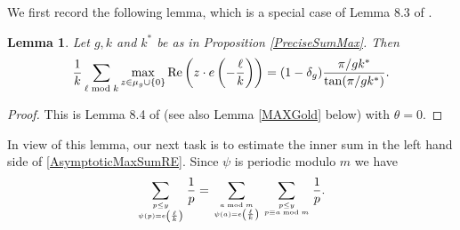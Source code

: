 \documentclass[12pt]{amsart}
\newtheorem{lem}[thm]{Lemma}
\theoremstyle{definition}
\numberwithin{equation}{section}
\newcommand{\mbf}{\mathbf}
\begin{document}
We first record the following lemma, which is a special case of Lemma 8.3 of \cite{GOLD}. 
\begin{lem} \label{MAX}
Let $g,k$ and $k^{\ast}$ be as in Proposition \ref{PreciseSumMax}. Then
\begin{equation*}
\frac{1}{k}\sum_{\ell\bmod k}\max_{z \in \mu_g \cup \{0\}} \textup{Re}\left(z \cdot e\left(-\frac{\ell}{k}\right)\right) = (1-\delta_g)\frac{\pi/gk^{\ast}}{\tan(\pi/gk^{\ast})}. 
\end{equation*}
\end{lem}
\begin{proof}
This is Lemma 8.4 of \cite{GOLD} (see also Lemma \ref{MAXGold} below) with $\theta=0$.
\end{proof}

In view of this lemma, our next task is to estimate the inner sum in the left hand side of \eqref{AsymptoticMaxSumRE}. Since $\psi$ is periodic modulo $m$ we have
\begin{equation} \label{ALLAS}
\sum_{p \leq y \atop \psi(p) = e\left(\frac{\ell}{k}\right)}\frac{1}{p} = \sum_{a \bmod m \atop \psi(a) = e\left(\frac{\ell}{k}\right)} \sum_{p \leq y \atop p\equiv a \bmod m} \frac{1}{p}.
\end{equation}

\end{document}
